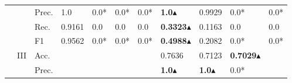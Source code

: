 \begin{tabular}{cclllllllll}
                                                                                                               &                                   & Prec.                                                & 1.0                     & 0.0*                    & 0.0*                         & 0.0*                    & \textbf{1.0}$\blacktriangle$                                                                & 0.9929                                                                      & 0.0*                                      & 0.0*                                      \\
                                                                                                               &                                   & Rec.                                                 & 0.9161                  & 0.0                     & 0.0                          & 0.0                     & \textbf{0.3323}$\blacktriangle$                                                             & 0.1163                                                                      & 0.0                                       & 0.0                                       \\
                                                                                                               &                                   & F1                                                   & 0.9562                  & 0.0*                    & 0.0*                         & 0.0*                    & \textbf{0.4988}$\blacktriangle$                                                             & 0.2082                                                                      & 0.0*                                      & 0.0*                                      \\ 
    \cmidrule{2-11}
                                                                                                               & \multirow{4}{*}{III}              & Acc.                                                 &                         &                         &                              &                         & 0.7636                                                                       & 0.7123                                                                      & \textbf{0.7029}$\blacktriangle$                          &                                           \\
                                                                                                               &                                   & Prec.                                                &                         &                         &                              &                         & \textbf{1.0}$\blacktriangle$                                                                & \textbf{1.0}$\blacktriangle$                                                               & 0.0*                                      &                                           \\

\end{tabular}
